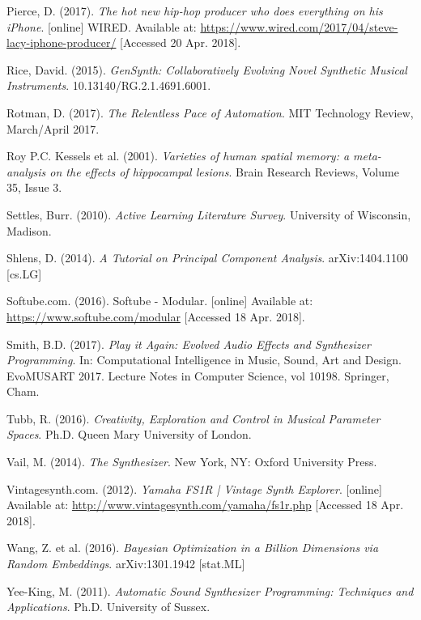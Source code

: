 \documentclass[11pt, oneside]{report}   	%
\begin{document}
{\begin{thebibliography}{9}
Pierce, D. (2017). \emph{The hot new hip-hop producer who does everything on his iPhone}. [online] WIRED. Available at: \url{https://www.wired.com/2017/04/steve-lacy-iphone-producer/} [Accessed 20 Apr. 2018].

Rice, David. (2015). \emph{GenSynth: Collaboratively Evolving Novel Synthetic Musical Instruments}. 10.13140/RG.2.1.4691.6001. 

Rotman, D. (2017). \emph{The Relentless Pace of Automation}. MIT Technology Review, March/April 2017.

Roy P.C. Kessels et al. (2001). \emph{Varieties of human spatial memory: a meta-analysis on the effects of hippocampal lesions}.
Brain Research Reviews,
Volume 35, Issue 3.

Settles, Burr. (2010). \emph{Active Learning Literature Survey}. University of Wisconsin, Madison.

Shlens, D. (2014). \emph{A Tutorial on Principal Component Analysis}. arXiv:1404.1100 [cs.LG]

Softube.com. (2016). Softube - Modular. [online] Available at: \url{https://www.softube.com/modular} [Accessed 18 Apr. 2018].

Smith, B.D. (2017). \emph{Play it Again: Evolved Audio Effects and Synthesizer Programming}. In: Computational Intelligence in Music, Sound, Art and Design. EvoMUSART 2017. Lecture Notes in Computer Science, vol 10198. Springer, Cham.

Tubb, R. (2016). \emph{Creativity, Exploration and Control in Musical Parameter Spaces}. Ph.D. Queen Mary University of London.

Vail, M. (2014). \emph{The Synthesizer}. New York, NY: Oxford University Press.

Vintagesynth.com. (2012). \emph{Yamaha FS1R | Vintage Synth Explorer}. [online] Available at: \url{http://www.vintagesynth.com/yamaha/fs1r.php} [Accessed 18 Apr. 2018].

Wang, Z. et al. (2016). \emph{Bayesian Optimization in a Billion Dimensions via Random Embeddings}. arXiv:1301.1942 [stat.ML]

Yee-King, M. (2011). \emph{Automatic Sound Synthesizer Programming: Techniques and Applications}. Ph.D. University of Sussex.


\end{thebibliography}}
\end{document}
